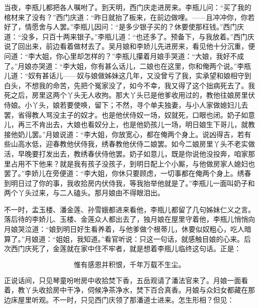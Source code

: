 当夜，李瓶儿都把各人嘱咐了。到天明，西门庆走进房来。李瓶儿问：“买了我的棺材来了没有？”西门庆道：“昨日就抬了板来，在前边做哩。——且冲冲你，你若好了，情愿舍与人罢。”李瓶儿因问：“是多少银子买的？休要使那枉钱。”西门庆道：“没多，只百十两来银子。”李瓶儿道：“也还多了。预备下，与我放着。”西门庆说了回出来，前边看着做材去了。吴月娘和李娇儿先进房来，看见他十分沉重，便问道：“李大姐，你心里却怎样的？”李瓶儿攥着月娘手哭道：“大娘，我好不成了。”月娘亦哭道：“李大姐，你有甚么话儿，二娘也在这里，你和俺两个说。”李瓶儿道：“奴有甚话儿——奴与娘做姊妹这几年，又没曾亏了我，实承望和娘相守到白头，不想我的命苦，先把个冤家没了，如今不幸，我又得了这个拙病死去了。我死之后，房里这两个丫头无人收拘。那大丫头已是他爹收用过的，教他往娘房里伏侍娘。小丫头，娘若要使唤，留下；不然，寻个单夫独妻，与小人家做媳妇儿去罢，省得教人骂没主子的奴才。也是他伏侍奴一场，奴就死，口眼也闭。奶子如意儿，再三不肯出去，大娘也看奴分上，也是他奶孩儿一场，明日娘生下哥儿，就教接他奶儿罢。”月娘说道：“李大姐，你放宽心，都在俺两个身上。说凶得吉，若有些山高水低，迎春教他伏侍我，绣春教他伏侍二娘罢。如今二娘房里丫头不老实做活，早晚要打发出去，教绣春伏侍他罢。奶子如意儿，既是你说他没投奔，咱家那里占用不下他来？就是我有孩子没孩子，到明日配上个小厮，与他做房家人媳妇也罢了。”李娇儿在旁便道：“李大姐，你休只要顾虑，一切事都在俺两个身上。绣春到明日过了你的事，我收拾房内伏侍我，等我抬举他就是了。”李瓶儿一面叫奶子和两个丫头过来，与二人磕头。那月娘由不得眼泪出。

不一时，盂玉楼、潘金莲、孙雪娥都进来看他，李瓶儿都留了几句姊妹仁义之言。落后待的李娇儿、玉楼、金莲众人都出去了，独月娘在屋里守着他，李瓶儿悄悄向月娘哭泣道：“娘到明日好生看养着，与他爹做个根蒂儿，休要似奴粗心，吃人暗算了。”月娘道：“姐姐，我知道。”看官听说：只这一句话，就感触目娘的心来。后次西门庆死了，金莲就在家中住不牢者，就是想着李瓶儿临终这句话。正是：

\[
惟有感恩并积恨，千年万载不生尘。
\]

正说话间，只见琴童吩咐房中收拾焚下香，五岳观请了潘法官来了。月娘一面看着，教丫头收拾房中干净，伺候净茶净水，焚下百合真香。月娘与众妇女都藏在那边床屋里听观。不一时，只见西门庆领了那潘道士进来。怎生形相？但见：

